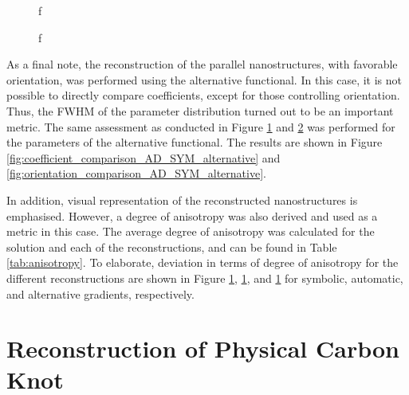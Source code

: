 \begin{figure}[h!]
    \centering
    \caption{f}
    \label{fig:coefficient_comparison_AD_SYM}
\end{figure}

\begin{figure}[h!]
    \centering
    \caption{ f   }
    \label{fig:orientation_comparison_AD_SYM}
\end{figure}


As a final note, the reconstruction of the parallel nanostructures, with favorable orientation, was performed using the alternative functional.
In this case, it is not possible to directly compare coefficients, except for those controlling orientation.
Thus, the FWHM of the parameter distribution turned out to be an important metric.
The same assessment as conducted in Figure \ref{fig:coefficient_comparison_AD_SYM} and \ref{fig:orientation_comparison_AD_SYM} was performed for the parameters of the alternative functional.
The results are shown in Figure \ref{fig:coefficient_comparison_AD_SYM_alternative} and \ref{fig:orientation_comparison_AD_SYM_alternative}.

In addition, visual representation of the reconstructed nanostructures is emphasised. %
However, a degree of anisotropy was also derived and used as a metric in this case. %
The average degree of anisotropy was calculated for the solution and each of the reconstructions, and can be found in Table \ref{tab:anisotropy}.
To elaborate, deviation in terms of degree of anisotropy for the different reconstructions are shown in Figure \ref{}, \ref{}, and \ref{} for symbolic, automatic, and alternative gradients, respectively.


\clearpage
\section{Reconstruction of Physical Carbon Knot}


